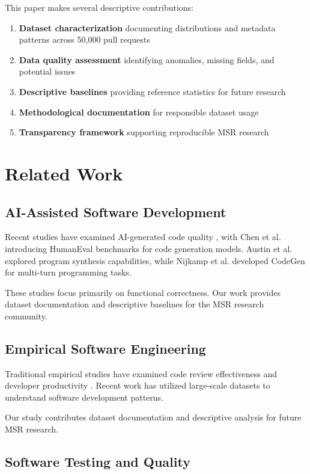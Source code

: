 \documentclass[conference]{IEEEtran}
\begin{document}
This paper makes several descriptive contributions:
\begin{enumerate}
    \item \textbf{Dataset characterization} documenting distributions and metadata patterns across 50,000 pull requests
    \item \textbf{Data quality assessment} identifying anomalies, missing fields, and potential issues
    \item \textbf{Descriptive baselines} providing reference statistics for future research
    \item \textbf{Methodological documentation} for responsible dataset usage
    \item \textbf{Transparency framework} supporting reproducible MSR research
\end{enumerate}

\section{Related Work}

\subsection{AI-Assisted Software Development}

Recent studies have examined AI-generated code quality \cite{chen2021evaluating}, with Chen et al. introducing HumanEval benchmarks for code generation models. Austin et al. \cite{austin2021program} explored program synthesis capabilities, while Nijkamp et al. \cite{nijkamp2023codegen} developed CodeGen for multi-turn programming tasks.

These studies focus primarily on functional correctness. Our work provides dataset documentation and descriptive baselines for the MSR research community.

\subsection{Empirical Software Engineering}

Traditional empirical studies have examined code review effectiveness \cite{bacchelli2013expectations} and developer productivity \cite{bareiss2023code}. Recent work has utilized large-scale datasets to understand software development patterns.

Our study contributes dataset documentation and descriptive analysis for future MSR research.

\subsection{Software Testing and Quality}
\end{document}

